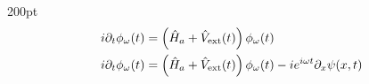 \begin{frame}
\begin{textblock*}{200pt}
\begin{align}
 i\partial_t \phi_{\omega}(t) 
 & = \left(\hat{H}_a + \hat{V}_{\rm ext}(t) \right) \phi_{\omega}(t) \nonumber\\
 i\partial_t \phi_{\omega}(t) 
 & = \left(\hat{H}_a + \hat{V}_{\rm ext}(t) \right) \phi_{\omega}(t) 
-i e^{i\omega t} \partial_x \psi (x,t) \nonumber
\end{align}

\end{textblock*}


\end{frame}




